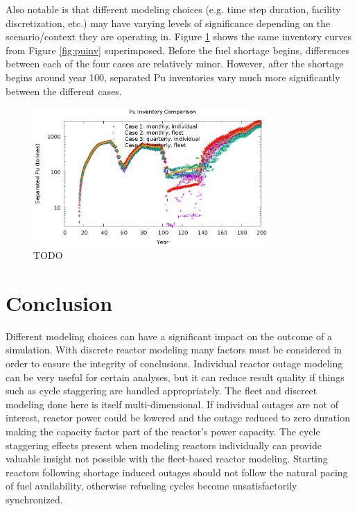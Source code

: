 \documentclass{style}
\begin{document}
Also notable is that different modeling choices (e.g. time step duration,
facility discretization, etc.) may have varying levels of significance
depending on the scenario/context they are operating in.  Figure
\ref{fig:puinv-compare} shows the same inventory curves from Figure
\ref{fig:puinv} superimposed.  Before the fuel shortage begins, differences
between each of the four cases are relatively minor.  However, after the
shortage begins around year 100, separated Pu inventories vary much more
significantly between the different cases.

\begin{figure}[!h]
    \centering
    \includegraphics[width=0.8\textwidth]{exp2/puinv-compare.eps}
    \caption[TODO]{
        TODO
    }
    \label{fig:puinv-compare}
\end{figure}

\section{Conclusion}

Different modeling choices can have a significant impact on the outcome of a
simulation.  With discrete reactor modeling many factors must be considered in
order to ensure the integrity of conclusions.  Individual reactor outage
modeling can be very useful for certain analyses, but it can reduce result
quality if things such as cycle staggering are handled appropriately.  The
fleet and discreet modeling done here is itself multi-dimensional.  If
individual outages are not of interest, reactor power could be lowered and the
outage reduced to zero duration making the capacity factor part of the
reactor's power capacity.  The cycle staggering effects present when modeling
reactors individually can provide valuable insight not possible with the
fleet-based reactor modeling.  Starting reactors following shortage induced
outages should not follow the natural pacing of fuel availability, otherwise
refueling cycles become unsatisfactorily synchronized.
\end{document}
